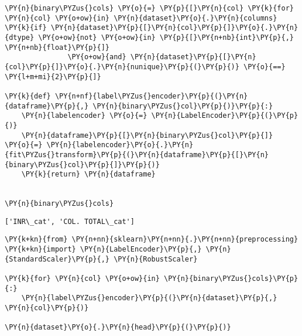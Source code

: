     \begin{tcolorbox}[breakable, size=fbox, boxrule=1pt, pad at break*=1mm,colback=cellbackground, colframe=cellborder]
\begin{Verbatim}[commandchars=\\\{\}]
\PY{n}{binary\PYZus{}cols} \PY{o}{=} \PY{p}{[}\PY{n}{col} \PY{k}{for} \PY{n}{col} \PY{o+ow}{in} \PY{n}{dataset}\PY{o}{.}\PY{n}{columns} \PY{k}{if} \PY{n}{dataset}\PY{p}{[}\PY{n}{col}\PY{p}{]}\PY{o}{.}\PY{n}{dtype} \PY{o+ow}{not} \PY{o+ow}{in} \PY{p}{[}\PY{n+nb}{int}\PY{p}{,} \PY{n+nb}{float}\PY{p}{]}
               \PY{o+ow}{and} \PY{n}{dataset}\PY{p}{[}\PY{n}{col}\PY{p}{]}\PY{o}{.}\PY{n}{nunique}\PY{p}{(}\PY{p}{)} \PY{o}{==} \PY{l+m+mi}{2}\PY{p}{]}

\PY{k}{def} \PY{n+nf}{label\PYZus{}encoder}\PY{p}{(}\PY{n}{dataframe}\PY{p}{,} \PY{n}{binary\PYZus{}col}\PY{p}{)}\PY{p}{:}
    \PY{n}{labelencoder} \PY{o}{=} \PY{n}{LabelEncoder}\PY{p}{(}\PY{p}{)}
    \PY{n}{dataframe}\PY{p}{[}\PY{n}{binary\PYZus{}col}\PY{p}{]} \PY{o}{=} \PY{n}{labelencoder}\PY{o}{.}\PY{n}{fit\PYZus{}transform}\PY{p}{(}\PY{n}{dataframe}\PY{p}{[}\PY{n}{binary\PYZus{}col}\PY{p}{]}\PY{p}{)}
    \PY{k}{return} \PY{n}{dataframe}


\PY{n}{binary\PYZus{}cols}
\end{Verbatim}
\end{tcolorbox}

            \begin{tcolorbox}[breakable, size=fbox, boxrule=.5pt, pad at break*=1mm, opacityfill=0]
\begin{Verbatim}[commandchars=\\\{\}]
['INR\_cat', 'COL. TOTAL\_cat']
\end{Verbatim}
\end{tcolorbox}
        
    \begin{tcolorbox}[breakable, size=fbox, boxrule=1pt, pad at break*=1mm,colback=cellbackground, colframe=cellborder]
\begin{Verbatim}[commandchars=\\\{\}]
\PY{k+kn}{from} \PY{n+nn}{sklearn}\PY{n+nn}{.}\PY{n+nn}{preprocessing} \PY{k+kn}{import} \PY{n}{LabelEncoder}\PY{p}{,} \PY{n}{StandardScaler}\PY{p}{,} \PY{n}{RobustScaler}

\PY{k}{for} \PY{n}{col} \PY{o+ow}{in} \PY{n}{binary\PYZus{}cols}\PY{p}{:}
    \PY{n}{label\PYZus{}encoder}\PY{p}{(}\PY{n}{dataset}\PY{p}{,} \PY{n}{col}\PY{p}{)}
    
\PY{n}{dataset}\PY{o}{.}\PY{n}{head}\PY{p}{(}\PY{p}{)}
\end{Verbatim}
\end{tcolorbox}

